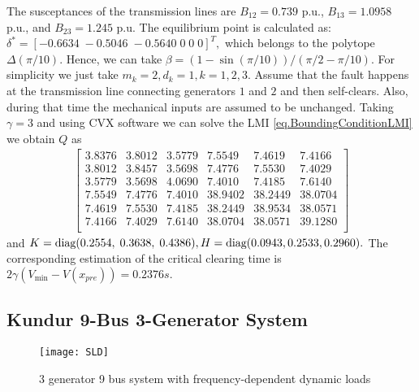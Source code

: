 \documentclass[final]{IEEEtran}
\begin{document}
The susceptances of the transmission lines are $B_{12}=0.739$
p.u., $B_{13}=1.0958$ p.u., and $B_{23}=1.245$ p.u. The
equilibrium point is calculated as: $\delta^*=[-0.6634\;
   -0.5046\;
   -0.5640 \;0\;0\;0]^T,$ which belongs to the polytope $\Delta(\pi/10).$ Hence, we can take $\beta=(1-\sin(\pi/10))/(\pi/2-\pi/10).$
   For simplicity we just take $m_k=2,d_k=1, k=1,2,3.$ Assume that the fault
   happens at the transmission line connecting
   generators $1$ and $2$ and then self-clears. Also, during that time the mechanical inputs are assumed to be unchanged.
   Taking $\gamma=3$ and using CVX software we can solve the LMI
   \eqref{eq.BoundingConditionLMI} we obtain $Q$ as
   \begin{align}
   \left[\begin{array}{cccccc}
    3.8376  &  3.8012 &   3.5779  &  7.5549  &  7.4619  &  7.4166 \\
    3.8012  &  3.8457  &  3.5698  &  7.4776  &  7.5530  &  7.4029 \\
    3.5779  &  3.5698  &  4.0690  &  7.4010  &  7.4185  &  7.6140 \\
    7.5549  &  7.4776  &  7.4010  & 38.9402  & 38.2449  & 38.0704 \\
    7.4619  &  7.5530  &  7.4185  & 38.2449  & 38.9534  & 38.0571 \\
    7.4166  &  7.4029  &  7.6140  & 38.0704  & 38.0571  & 39.1280 \\
    \end{array}\right]
   \end{align}
   and $K= \emph{\emph{diag}}(0.2554,
   \;       0.3638,
   \;       0.4386), H=  \emph{\emph{diag}}(0.0943,0.2533,0.2960).$ The corresponding estimation of the critical clearing time is $2\gamma (V_{\min}-V(x_{pre}))= 0.2376 s.$

\subsection{Kundur 9-Bus 3-Generator System}
\begin{figure}[t!]
\centering
\texttt{[image: SLD]}
\caption{3 generator 9 bus system with frequency-dependent dynamic
loads} \label{fig.3generator9bus}
\end{figure}
\end{document}
